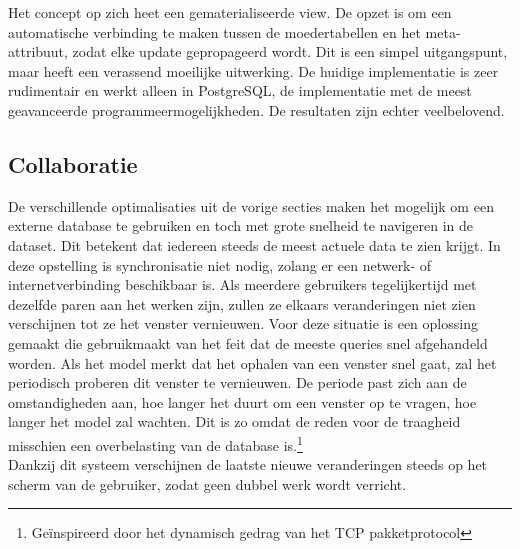 Het concept op zich heet een gematerialiseerde view. De opzet is om een automatische verbinding te maken tussen de moedertabellen en het meta-attribuut, zodat elke update gepropageerd wordt. Dit is een simpel uitgangspunt, maar heeft een verassend moeilijke uitwerking. De huidige implementatie is zeer rudimentair en werkt alleen in PostgreSQL, de implementatie met de meest geavanceerde programmeermogelijkheden. De resultaten zijn echter veelbelovend.

\subsection{Collaboratie}
De verschillende optimalisaties uit de vorige secties maken het mogelijk om een externe database te gebruiken en toch met grote snelheid te navigeren in de dataset. Dit betekent dat iedereen steeds de meest actuele data te zien krijgt. In deze opstelling is synchronisatie niet nodig, zolang er een netwerk- of internetverbinding beschikbaar is. Als meerdere gebruikers tegelijkertijd met dezelfde paren aan het werken zijn, zullen ze elkaars veranderingen niet zien verschijnen tot ze het venster vernieuwen. Voor deze situatie is een oplossing gemaakt die gebruikmaakt van het feit dat de meeste queries snel afgehandeld worden. Als het model merkt dat het ophalen van een venster snel gaat, zal het periodisch proberen dit venster te vernieuwen. De periode past zich aan de omstandigheden aan, hoe langer het duurt om een venster op te vragen, hoe langer het model zal wachten. Dit is zo omdat de reden voor de traagheid misschien een overbelasting van de database is.\footnote{Ge\"inspireerd door het dynamisch gedrag van het TCP pakketprotocol}\\

Dankzij dit systeem verschijnen de laatste nieuwe veranderingen steeds op het scherm van de gebruiker, zodat geen dubbel werk wordt verricht.

% 
% 

